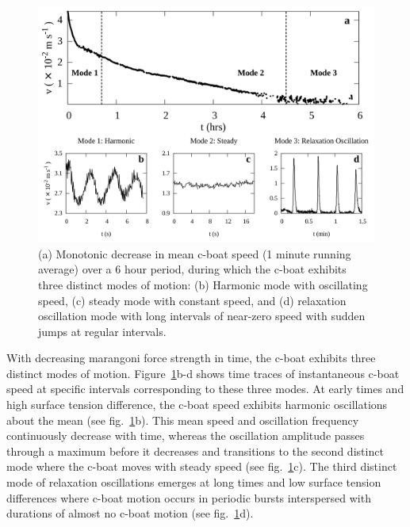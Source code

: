 \documentclass[journal=langd5, manuscript=article, layout=twocolumn]{achemso}
\begin{document}
\begin{figure}[ht]
\centering
\includegraphics[width=0.85\linewidth]{figure2_v2.pdf}
\caption{(a) Monotonic decrease in mean c-boat speed (1 minute running average) over a 6 hour period, during which the c-boat exhibits three distinct modes of motion: (b) Harmonic mode with oscillating speed, (c) steady mode with constant speed, and (d) relaxation oscillation mode with long intervals of near-zero speed with sudden jumps at regular intervals.}
\label{fig2}
\end{figure}

With decreasing marangoni force strength in time, the c-boat exhibits three distinct modes of motion.  Figure~\ref{fig2}b-d shows time traces of instantaneous c-boat speed at specific intervals corresponding to these three modes. At early times and high surface tension difference, the c-boat speed exhibits harmonic oscillations about the mean (see fig.~\ref{fig2}b). This mean speed and oscillation frequency continuously decrease with time, whereas the oscillation amplitude passes through a maximum before it decreases and transitions to the second distinct mode where the c-boat moves with steady speed (see fig.~\ref{fig2}c). The third distinct mode of relaxation oscillations emerges at long times and low surface tension differences where c-boat motion occurs in periodic bursts interspersed with durations of almost no c-boat motion (see fig.~\ref{fig2}d).
\end{document}
